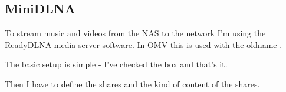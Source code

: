 

\subsection{MiniDLNA}

To stream music and videos from the \gls{NAS} to the network I'm using the
\href{https://sourceforge.net/projects/minidlna/}{ReadyDLNA} media server
software. In \gls{OMV} this is used with the oldname .


The basic setup is simple - I've checked the  box and that's
it.


Then I have to define the shares and the kind of content of the shares.

